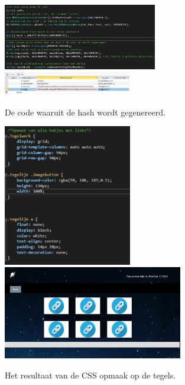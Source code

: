 \documentclass[11pt]{article}
\begin{document}
\begin{figure}[h]
	\centering
	\includegraphics[width=0.6\textwidth]{hash2}
	\newline
	\includegraphics[width=0.5\textwidth]{DTBhashen}
	\caption{De code waaruit de hash wordt gegenereerd.}
	\label{Hash}
\end{figure}
	\newpage
	\begin{figure}[h]
		\centering
		\includegraphics[width=0.5\textwidth]{cssTegel}
		\newline
		\includegraphics[width=0.7\textwidth]{Tv1}
		\caption{Het resultaat van de CSS opmaak op de tegels.}
		\label{TegelV1}
			
	\end{figure}
\newpage
\end{document}
